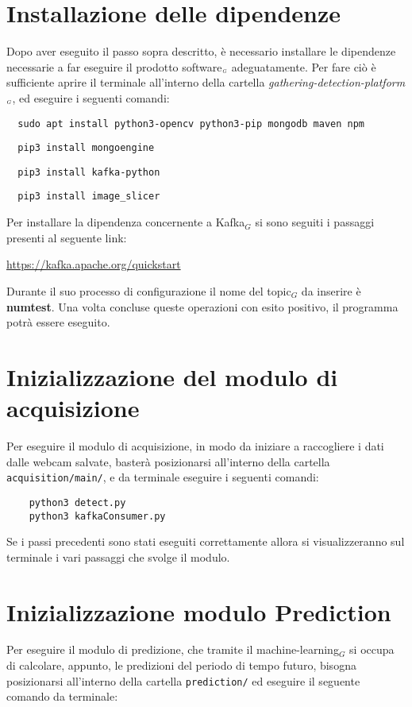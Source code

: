 \section{Installazione delle dipendenze}\label{ProceduraDiInstallazioneInstallazioneDipendenze}
Dopo aver eseguito il passo sopra descritto, è necessario installare le dipendenze necessarie a far eseguire il prodotto software$_{\scaleto{G}{3pt}}$ adeguatamente.
Per fare ciò è sufficiente aprire il terminale all'interno della cartella \textit{gathering-detection-platform$_{\scaleto{G}{3pt}}$}, ed eseguire i seguenti comandi:
\begin{lstlisting}
  sudo apt install python3-opencv python3-pip mongodb maven npm
\end{lstlisting}
\begin{lstlisting}
  pip3 install mongoengine
\end{lstlisting}
\begin{lstlisting}
  pip3 install kafka-python
\end{lstlisting}
\begin{lstlisting}
  pip3 install image_slicer
\end{lstlisting}
Per installare la dipendenza concernente a Kafka$_G$ si sono seguiti i passaggi presenti al seguente link:
\begin{center}
    \url{https://kafka.apache.org/quickstart}
\end{center}
Durante il suo processo di configurazione il nome del topic$_G$ da inserire è \textbf{numtest}.
Una volta concluse queste operazioni con esito positivo, il programma potrà essere eseguito.

\section{Inizializzazione del modulo di acquisizione}\label{ProceduraDiInstallazioneInizializzazioneModuloAcquisition}
Per eseguire il modulo di acquisizione, in modo da iniziare a raccogliere i dati dalle webcam salvate, basterà posizionarsi all'interno della cartella \texttt{acquisition/main/}, e da terminale eseguire i seguenti comandi:
\begin{lstlisting}
    python3 detect.py
    python3 kafkaConsumer.py
\end{lstlisting}
Se i passi precedenti sono stati eseguiti correttamente allora si visualizzeranno sul terminale i vari passaggi che svolge il modulo.



\section{Inizializzazione modulo Prediction}\label{ProceduraDiInstallazioneInizializzazioneModuloPrediction}
Per eseguire il modulo di predizione, che tramite il machine-learning$_G$ si occupa di calcolare, appunto, le predizioni del periodo di tempo futuro, bisogna posizionarsi all'interno della cartella \texttt{prediction/} ed eseguire il seguente comando da terminale:

